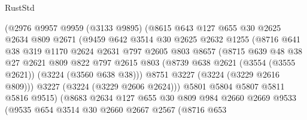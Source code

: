 \begin{lexlean}{RustStd}
\begin{coremodule}
                      (@2976
                        @9957
                        @9959
                        (@3133 @9895)
                        (@8615
                          @643
                          @127
                          @655
                          @30
                          @2625
                          @2634
                          @809
                          @2671
                          (@9459
                            @642
                            @3514
                            @30
                            @2625
                            @2632
                            @1255
                            (@8716
                              @641
                              @38
                              @319
                              @1170
                              @2624
                              @2631
                              @797
                              @2605
                              @803
                              @8657
                              (@8715
                                @639
                                @48
                                @38
                                @27
                                @2621
                                @809
                                @822
                                @797
                                @2615
                                @803
                                (@8739 @638 @2621 (@3554 (@3555 @2621)) (@3224 (@3560 @638 @38)))
                                @8751
                                @3227
                                (@3224 (@3229 @2616 @809)))
                              @3227
                              (@3224 (@3229 @2606 @2624)))
                            @5801
                            @5804
                            @5807
                            @5811
                            @5816
                            @9515)
                          (@8683
                            @2634
                            @127
                            @655
                            @30
                            @809
                            @984
                            @2660
                            @2669
                            @9533
                            (@9535
                              @654
                              @3514
                              @30
                              @2660
                              @2667
                              @2567
                              (@8716
                                @653

\end{coremodule}
\end{lexlean}
